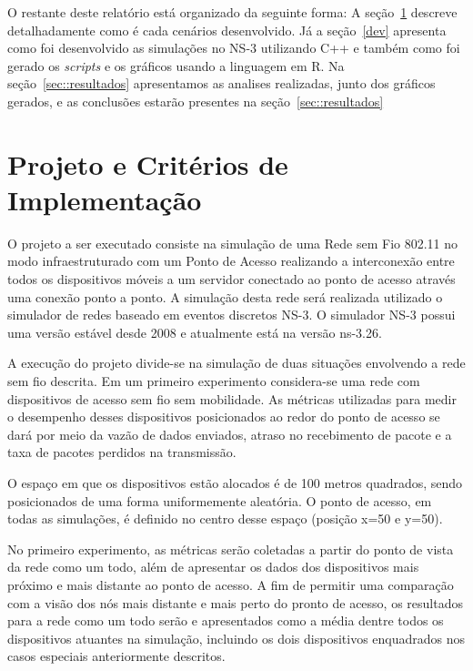 \documentclass[12pt]{article}
\begin{document}
O restante deste relatório está organizado da seguinte forma: A seção~\ref{projeto} descreve detalhadamente como é cada cenários desenvolvido. Já a seção~\ref{dev} apresenta como foi desenvolvido as simulações no NS-3 utilizando C++ e também como foi gerado os   \textit{scripts} e os gráficos usando a linguagem em R. Na seção~\ref{sec::resultados} apresentamos as analises realizadas, junto dos gráficos gerados, e as conclusões estarão presentes na seção~\ref{sec::resultados}



\section{Projeto e Critérios de Implementação}
\label{projeto} \label{sec:proj_e_criterios}

O projeto a ser executado consiste na simulação de uma Rede sem Fio 802.11 no modo infraestruturado com um Ponto de Acesso realizando a interconexão entre todos os dispositivos móveis a um servidor conectado ao ponto de acesso através uma conexão ponto a ponto. A simulação desta rede será realizada utilizado o simulador de redes baseado em eventos discretos NS-3. O simulador NS-3 \cite{henderson2008network, riley2010ns} possui uma versão estável desde 2008 e atualmente está na versão ns-3.26.

A execução do projeto divide-se na simulação de duas situações envolvendo a rede sem fio descrita. Em um primeiro experimento considera-se uma rede com dispositivos de acesso sem fio sem mobilidade. As métricas utilizadas para medir o desempenho desses dispositivos posicionados ao redor do ponto de acesso se dará por meio da vazão de dados enviados, atraso no recebimento de pacote e a taxa de pacotes perdidos na transmissão.

O espaço em que os dispositivos estão alocados é de 100 metros quadrados, sendo posicionados de uma forma uniformemente aleatória. O ponto de acesso, em todas as simulações, é definido no centro desse espaço (posição x=50 e y=50).

No primeiro experimento, as métricas serão coletadas a partir do ponto de vista da rede como um todo, além de apresentar os dados dos dispositivos mais próximo e mais distante ao ponto de acesso. A fim de permitir uma comparação com a visão dos nós mais distante e mais perto do pronto de acesso, os resultados para a rede como um todo serão e apresentados como a média dentre todos os dispositivos atuantes na simulação, incluindo os dois dispositivos enquadrados nos casos especiais anteriormente descritos.
    
\end{document}
